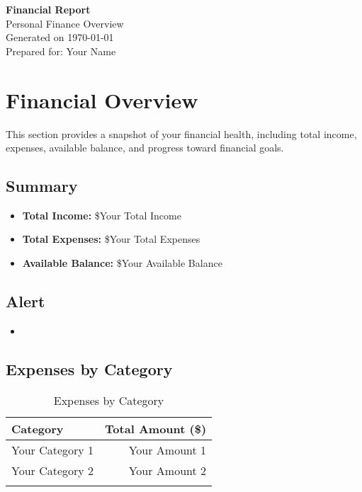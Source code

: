 \documentclass[a4paper,12pt]{article}
\begin{document}
\begin{titlepage}
    \centering
    \vspace*{2cm}
    \Huge{\textbf{Financial Report}} \\
    \vspace{0.5cm}
    \Large{Personal Finance Overview} \\
    \vspace{1cm}
    \normalsize{Generated on \today} \\
    \vspace{2cm}
    \normalsize{Prepared for: Your Name} \\
    \vfill
\end{titlepage}

\tableofcontents
\newpage

\section{Financial Overview}
This section provides a snapshot of your financial health, including total income, expenses, available balance, and progress toward financial goals.

\subsection{Summary}
\begin{itemize}[leftmargin=*]
    \item \textbf{Total Income:} \$Your Total Income
    \item \textbf{Total Expenses:} \$Your Total Expenses
    \item \textbf{Available Balance:} \$Your Available Balance
\end{itemize}

\ifx\YourAlert\undefined
\else
\subsection{Alert}
\begin{itemize}[leftmargin=*]
    \item \textcolor{red}{\YourAlert}
\end{itemize}
\fi

\subsection{Expenses by Category}
\begin{longtable}{l r}
    \toprule
    \textbf{Category} & \textbf{Total Amount (\$)} \\
    \midrule
    \endhead
    Your Category 1 & Your Amount 1 \\
    Your Category 2 & Your Amount 2 \\
    \bottomrule
    \caption{Expenses by Category}
    \label{tab:expenses_by_category}
\end{longtable}
\end{document}
